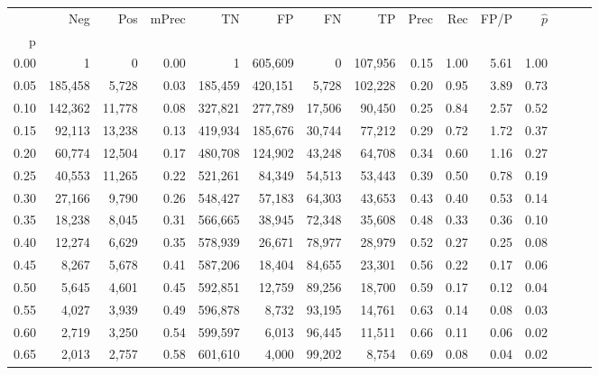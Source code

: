 \begin{tabular}{rrrrrrrrrrrrrrr}
\toprule
{} &      Neg &     Pos & mPrec &       TN &       FP &       FN &       TP &  Prec &   Rec &  FP/P & $\hat{p}$ \\
p    &          &         &       &          &          &          &          &       &       &       &           \\
\midrule
0.00 &        1 &       0 &  0.00 &        1 &  605,609 &        0 &  107,956 &  0.15 &  1.00 &  5.61 &      1.00 \\
0.05 &  185,458 &   5,728 &  0.03 &  185,459 &  420,151 &    5,728 &  102,228 &  0.20 &  0.95 &  3.89 &      0.73 \\
0.10 &  142,362 &  11,778 &  0.08 &  327,821 &  277,789 &   17,506 &   90,450 &  0.25 &  0.84 &  2.57 &      0.52 \\
0.15 &   92,113 &  13,238 &  0.13 &  419,934 &  185,676 &   30,744 &   77,212 &  0.29 &  0.72 &  1.72 &      0.37 \\
0.20 &   60,774 &  12,504 &  0.17 &  480,708 &  124,902 &   43,248 &   64,708 &  0.34 &  0.60 &  1.16 &      0.27 \\
0.25 &   40,553 &  11,265 &  0.22 &  521,261 &   84,349 &   54,513 &   53,443 &  0.39 &  0.50 &  0.78 &      0.19 \\
0.30 &   27,166 &   9,790 &  0.26 &  548,427 &   57,183 &   64,303 &   43,653 &  0.43 &  0.40 &  0.53 &      0.14 \\
0.35 &   18,238 &   8,045 &  0.31 &  566,665 &   38,945 &   72,348 &   35,608 &  0.48 &  0.33 &  0.36 &      0.10 \\
0.40 &   12,274 &   6,629 &  0.35 &  578,939 &   26,671 &   78,977 &   28,979 &  0.52 &  0.27 &  0.25 &      0.08 \\
0.45 &    8,267 &   5,678 &  0.41 &  587,206 &   18,404 &   84,655 &   23,301 &  0.56 &  0.22 &  0.17 &      0.06 \\
0.50 &    5,645 &   4,601 &  0.45 &  592,851 &   12,759 &   89,256 &   18,700 &  0.59 &  0.17 &  0.12 &      0.04 \\
0.55 &    4,027 &   3,939 &  0.49 &  596,878 &    8,732 &   93,195 &   14,761 &  0.63 &  0.14 &  0.08 &      0.03 \\
0.60 &    2,719 &   3,250 &  0.54 &  599,597 &    6,013 &   96,445 &   11,511 &  0.66 &  0.11 &  0.06 &      0.02 \\
0.65 &    2,013 &   2,757 &  0.58 &  601,610 &    4,000 &   99,202 &    8,754 &  0.69 &  0.08 &  0.04 &      0.02 \\

\end{tabular}
